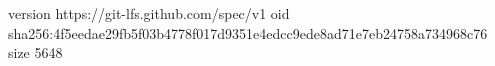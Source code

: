 version https://git-lfs.github.com/spec/v1
oid sha256:4f5eedae29fb5f03b4778f017d9351e4edcc9ede8ad71e7eb24758a734968c76
size 5648
